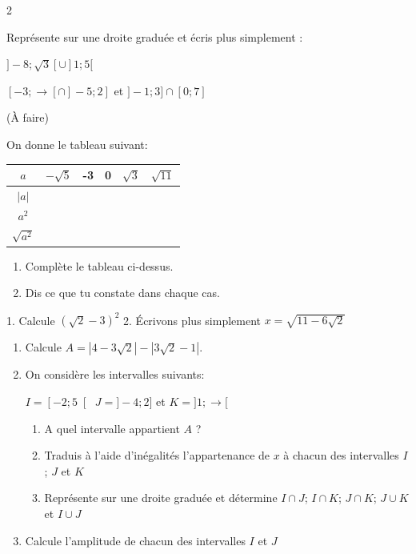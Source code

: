\begin{multicols}{2}
  	
  	Représente sur une droite graduée et écris plus simplement :
  	
  	$]-8;\sqrt{3}[\cup ]1;5[$ 
  	
  	$[-3;\rightarrow[\cap ]-5;2]$ et $]-1;3]\cap[0;7]$ 
  	
  	\dures
  	(\`A faire)

  	
  	On donne le tableau suivant: 
  	
  	\begin{tabular}{|c|c|c|c|c|c|}
  		\hline
  		$a$	& $-\sqrt{5}$  & -3  &0  & $\sqrt{3}$ & $\sqrt{11}$  \\
  		\hline
  		$\left| a \right |$	&  &  &  &  &  \\
  		\hline
  		$a^2$	&  &  &  &  &  \\
  		\hline
  		$\sqrt{a^2}$	&  &  &  &  &  \\
  		\hline
  	\end{tabular}
  	\begin{enumerate}
  		\item Complète le tableau ci-dessus.
  		\item Dis ce que tu constate dans chaque cas.
  	\end{enumerate}
  	\dures
   	
  	1. Calcule  $\left( \sqrt{2}-3 \right)^2 $
  	2. Écrivons plus simplement $x=\sqrt{11-6\sqrt{2}}$
  	\dures 
   	\begin{center}
  	\end{center}
  	\begin{center}
  	\end{center}
  	\begin{enumerate}
  		\item Calcule $A=\left|4-3\sqrt{2} \right |-\left|3\sqrt{2}-1 \right |$.
  		\item On considère les intervalles suivants:
  		
  		$I=\left[-2;5\right[$  $J=]-4;2]$	 et $K=]1;\rightarrow[$
  		\begin{enumerate}
  			\item  A quel intervalle appartient $A$ ?
  			\item   Traduis à l'aide  d'inégalités l'appartenance de $x$ à chacun des intervalles $I$; $J$ et $K$
  			\item  Représente sur une  droite graduée et détermine $I\cap J$;  $I\cap K$; $J\cap K$; $J\cup K$ et $I\cup J$
  		\end{enumerate} 
  		\item Calcule l'amplitude de chacun des intervalles $I$ et  $J$
  	\end{enumerate} 
  	

\end{multicols}
